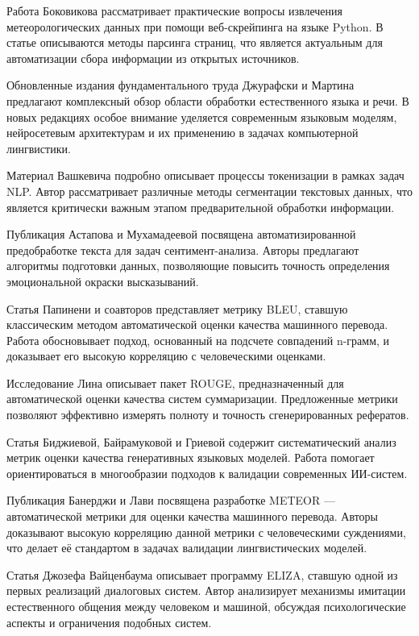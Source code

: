 \documentclass[coursework]{SCWorks}
\begin{document}
    Работа Боковикова \cite{bokovikov2024weather} рассматривает практические вопросы извлечения метеорологических данных при помощи веб-скрейпинга на языке Python. В статье описываются методы парсинга страниц, что является актуальным для автоматизации сбора информации из открытых источников.

    Обновленные издания фундаментального труда Джурафски и Мартина \cite{JurafskyMartin, jm3} предлагают комплексный обзор области обработки естественного языка и речи. В новых редакциях особое внимание уделяется современным языковым моделям, нейросетевым архитектурам и их применению в задачах компьютерной лингвистики.

    Материал Вашкевича \cite{Vashkevich} подробно описывает процессы токенизации в рамках задач NLP. Автор рассматривает различные методы сегментации текстовых данных, что является критически важным этапом предварительной обработки информации.

    Публикация Астапова и Мухамадеевой \cite{AstapovMukhamadeeva} посвящена автоматизированной предобработке текста для задач сентимент-анализа. Авторы предлагают алгоритмы подготовки данных, позволяющие повысить точность определения эмоциональной окраски высказываний.

    Статья Папинени и соавторов \cite{papineni2002bleu} представляет метрику BLEU, ставшую классическим методом автоматической оценки качества машинного перевода. Работа обосновывает подход, основанный на подсчете совпадений n-грамм, и доказывает его высокую корреляцию с человеческими оценками.

    Исследование Лина \cite{Lin2004ROUGE} описывает пакет ROUGE, предназначенный для автоматической оценки качества систем суммаризации. Предложенные метрики позволяют эффективно измерять полноту и точность сгенерированных рефератов.

    Статья Биджиевой, Байрамуковой и Гриевой \cite{Bidzhieva2024} содержит систематический анализ метрик оценки качества генеративных языковых моделей. Работа помогает ориентироваться в многообразии подходов к валидации современных ИИ-систем.

    Публикация Банерджи и Лави \cite{banarjee2005} посвящена разработке METEOR — автоматической метрики для оценки качества машинного перевода. Авторы доказывают высокую корреляцию данной метрики с человеческими суждениями, что делает её стандартом в задачах валидации лингвистических моделей.

    Статья Джозефа Вайценбаума \cite{weizenbaum1966} описывает программу ELIZA, ставшую одной из первых реализаций диалоговых систем. Автор анализирует механизмы имитации естественного общения между человеком и машиной, обсуждая психологические аспекты и ограничения подобных систем.
\end{document}
